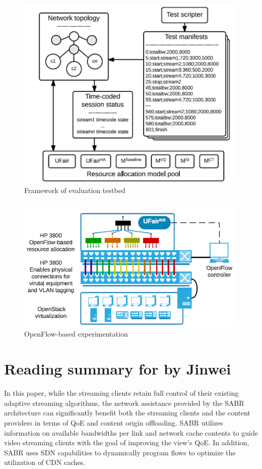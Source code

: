 \documentclass{article}
\begin{document}
\begin{figure}
\centering
\includegraphics[scale=0.5]{images/topology.png}
\caption{Framework of evaluation testbed}
\label{fig:topology}
\end{figure}


\begin{figure}
\centering
\includegraphics[scale=0.5]{images/switch.png}
\caption{OpenFlow-based experimentation}
\label{fig:switch}
\end{figure}


\section{Reading summary for \texorpdfstring{\cite{bhat_network_2017}}, by Jinwei}
In this paper, while the streaming clients retain full control of their existing adaptive streaming algorithms, the network assistance provided by the SABR architecture can significantly benefit both the streaming clients and the content providers in terms of QoE and content origin offloading. SABR utilizes information on available bandwidths per link and network cache contents to guide video streaming clients with the goal of improving the view's QoE. In addition, SABR uses SDN capabilities to dynamically program flows to optimize the utilization of CDN caches. 
\end{document}
